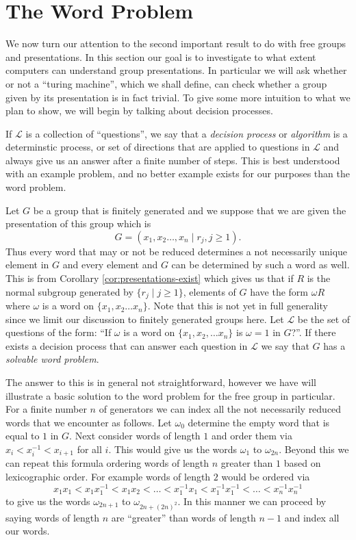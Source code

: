\documentclass[12pt]{article}
\theoremstyle{definition}
\numberwithin{equation}{theorem}
\begin{document}
\section{The Word Problem}
\label{sec:wp}
We now turn our attention to the second important result to do with free groups and presentations. In this section our goal is to investigate to what extent computers can understand group presentations. In particular we will ask whether or not a ``turing machine'', which we shall define, can check whether a group given by its presentation is in fact trivial. To give some more intuition to what we plan to show, we will begin by talking about decision processes.

If $\mathcal{L}$ is a collection of ``questions'', we say that a \emph{decision process} or \emph{algorithm} is a determinstic process, or set of directions that are applied to questions
in $\mathcal{L}$ and always give us an answer after a finite number of steps. This is best understood with an example problem, and no better example exists for our purposes than the word problem.

Let $G$ be a group that is finitely generated and we suppose that we are given the presentation of this group which is
\begin{equation*}
  G = (x_1,x_2\dots,x_n \mid r_j,j \geq 1).
\end{equation*}
Thus every word that may or not be reduced determines a not necessarily unique element in $G$ and every element and $G$ can be determined by such a word as well. This is from Corollary \ref{cor:presentations-exist} which gives us that if $R$ is the normal subgroup generated by $\{r_j \mid j \geq 1\}$, elements of $G$ have the form $\omega R$ where $\omega$ is a word on $\{x_1,x_2 \dots x_n\}$. Note that this is not yet in full generality since we limit our discussion to finitely generated groups here. Let $\mathcal{L}$ be the set of questions of the form: ``If $\omega$ is a word on $\{x_1,x_2, \dots x_n \}$ is $\omega = 1$ in $G$?''.
If there exists a decision process that can answer each question in $\mathcal{L}$ we say that $G$ has a \emph{solvable word problem}.

The answer to this is in general not straightforward, however we have will illustrate a basic solution to the word problem for the free group in particular. For a finite number $n$ of generators we can index all the not necessarily reduced words that we encounter as follows. Let $\omega_0$ determine the empty word that is equal to $1$ in $G$. Next consider words of length $1$ and order them via $x_i < x_i^{-1}< x_{i+1}$ for all $i$. This would give us the words $\omega_1$ to $\omega_{2n}$. Beyond this we can repeat this formula ordering words of length $n$ greater than $1$ based on lexicographic order. For example words of length $2$ would be ordered via
\begin{equation*}
  x_1x_1 < x_1x_1^{-1} < x_1x_2 < \dots < x_1^{-1}x_1 < x_1^{-1}x_1^{-1} < \dots < x_n^{-1}x_n^{-1}
\end{equation*}
to give us the words $\omega_{2n + 1}$ to $\omega_{2n + (2n)^2}$. In this manner we can proceed by saying words of length $n$ are ``greater'' than words of length $n-1$ and index all our words.
\end{document}
